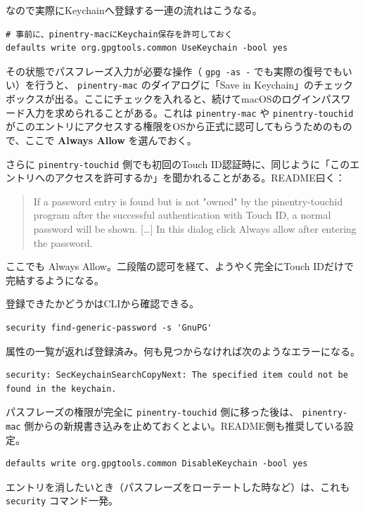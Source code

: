 \documentclass[11pt]{article}
\begin{document}
\begin{enumerate}
なので実際にKeychainへ登録する一連の流れはこうなる。

\begin{verbatim}
# 事前に、pinentry-macにKeychain保存を許可しておく
defaults write org.gpgtools.common UseKeychain -bool yes
\end{verbatim}

その状態でパスフレーズ入力が必要な操作（ \texttt{gpg -as -} でも実際の復号でもいい）を行うと、 \texttt{pinentry-mac} のダイアログに「Save in Keychain」のチェックボックスが出る。ここにチェックを入れると、続けてmacOSのログインパスワード入力を求められることがある。これは \texttt{pinentry-mac} や \texttt{pinentry-touchid} がこのエントリにアクセスする権限をOSから正式に認可してもらうためのもので、ここで \textbf{Always Allow} を選んでおく。

さらに \texttt{pinentry-touchid} 側でも初回のTouch ID認証時に、同じように「このエントリへのアクセスを許可するか」を聞かれることがある。README曰く：

\begin{quote}
If a password entry is found but is not "owned" by the pinentry-touchid program after the successful authentication with Touch ID, a normal password will be shown. [\ldots{}] In this dialog click Always allow after entering the password.
\end{quote}

ここでも Always Allow。二段階の認可を経て、ようやく完全にTouch IDだけで完結するようになる。

登録できたかどうかはCLIから確認できる。

\begin{verbatim}
security find-generic-password -s 'GnuPG'
\end{verbatim}

属性の一覧が返れば登録済み。何も見つからなければ次のようなエラーになる。

\begin{verbatim}
security: SecKeychainSearchCopyNext: The specified item could not be found in the keychain.
\end{verbatim}

パスフレーズの権限が完全に \texttt{pinentry-touchid} 側に移った後は、 \texttt{pinentry-mac} 側からの新規書き込みを止めておくとよい。README側も推奨している設定。

\begin{verbatim}
defaults write org.gpgtools.common DisableKeychain -bool yes
\end{verbatim}

エントリを消したいとき（パスフレーズをローテートした時など）は、これも \texttt{security} コマンド一発。


\end{enumerate}
\end{document}
